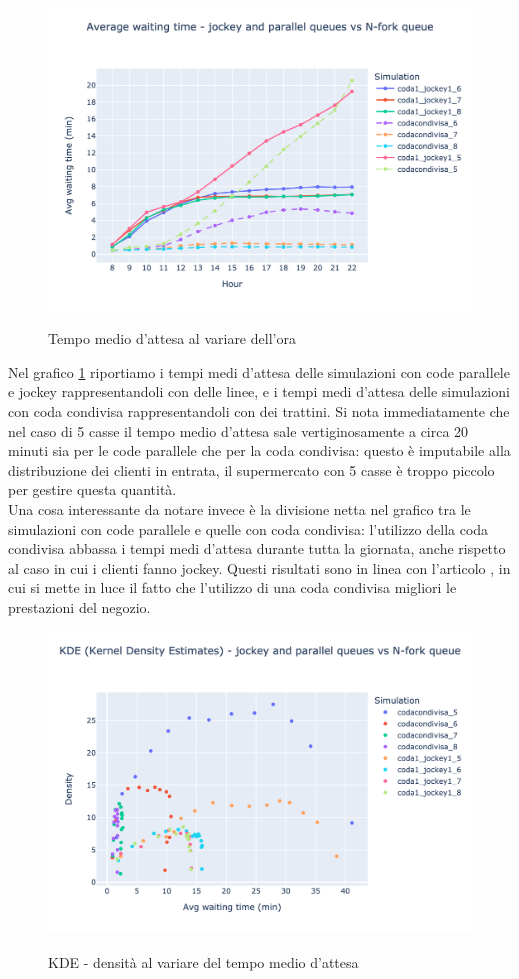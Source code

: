 \begin{figure}[H]
	\centering
	\includegraphics[width=12cm]{"images/results/avg_wt_codacondivisa.png"}
	\label{fig:avg_wt_codacondivisa}
	\caption{Tempo medio d'attesa al variare dell'ora}
\end{figure}

Nel grafico \ref{fig:avg_wt_codacondivisa} riportiamo i tempi medi d'attesa delle simulazioni con code parallele e jockey rappresentandoli con delle linee, e i tempi medi d'attesa delle simulazioni con coda condivisa rappresentandoli con dei trattini. Si nota immediatamente che nel caso di 5 casse il tempo medio d'attesa sale vertiginosamente a circa 20 minuti sia per le code parallele che per la coda condivisa: questo è imputabile alla distribuzione dei clienti in entrata, il supermercato con 5 casse è troppo piccolo per gestire questa quantità. \\
Una cosa interessante da notare invece è la divisione netta nel grafico tra le simulazioni con code parallele e quelle con coda condivisa: l'utilizzo della coda condivisa abbassa i tempi medi d'attesa durante tutta la giornata, anche rispetto al caso in cui i clienti fanno jockey. Questi risultati sono in linea con l'articolo \cite{yanagisawa2011methods}, in cui si mette in luce il fatto che l'utilizzo di una coda condivisa migliori le prestazioni del negozio.

\begin{figure}[H]
	\centering
	\includegraphics[width=12cm]{"images/results/kde_codacondivisa.png"}
	\label{fig:kde_codacondivisa}
	\caption{KDE - densità al variare del tempo medio d'attesa}
\end{figure}

